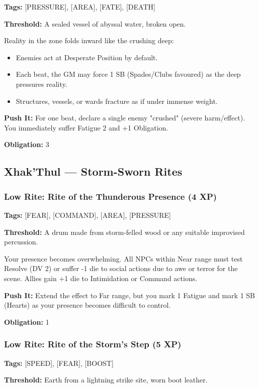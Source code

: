 \textbf{Tags:} [PRESSURE], [AREA], [FATE], [DEATH]

\textbf{Threshold:} A sealed vessel of abyssal water, broken open.

Reality in the zone folds inward like the crushing deep:
\begin{itemize}
\item Enemies act at Desperate Position by default.
\item Each beat, the GM may force 1 SB (Spades/Clubs favoured) as the deep pressures reality.
\item Structures, vessels, or wards fracture as if under immense weight.
\end{itemize}

\textbf{Push It:} For one beat, declare a single enemy "crushed" (severe harm/effect). You immediately suffer Fatigue 2 and +1 Obligation.

\textbf{Obligation:} 3

\subsection{Xhak'Thul — Storm-Sworn Rites}

\subsubsection{Low Rite: Rite of the Thunderous Presence (4 XP)}

\textbf{Tags:} [FEAR], [COMMAND], [AREA], [PRESSURE]

\textbf{Threshold:} A drum made from storm-felled wood or any suitable improvised percussion.

Your presence becomes overwhelming. All NPCs within Near range must test Resolve (DV 2) or suffer -1 die to social actions due to awe or terror for the scene. Allies gain +1 die to Intimidation or Command actions.

\textbf{Push It:} Extend the effect to Far range, but you mark 1 Fatigue and mark 1 SB (Hearts) as your presence becomes difficult to control.

\textbf{Obligation:} 1

\subsubsection{Low Rite: Rite of the Storm's Step (5 XP)}

\textbf{Tags:} [SPEED], [FEAR], [BOOST]

\textbf{Threshold:} Earth from a lightning strike site, worn boot leather.

